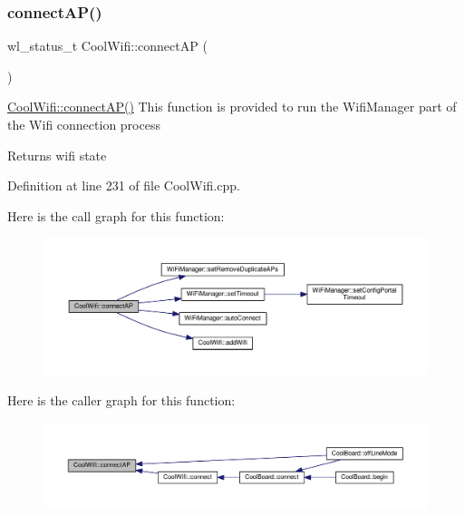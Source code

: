 \subsubsection{\texorpdfstring{connect\+A\+P()}{connectAP()}}
{\footnotesize\ttfamily wl\+\_\+status\+\_\+t Cool\+Wifi\+::connect\+AP (\begin{DoxyParamCaption}{ }\end{DoxyParamCaption})}

\hyperlink{class_cool_wifi_a7c857f27161782f5ef1d62d552aff971}{Cool\+Wifi\+::connect\+A\+P()} This function is provided to run the Wifi\+Manager part of the Wifi connection process

\begin{DoxyReturn}{Returns}
wifi state 
\end{DoxyReturn}


Definition at line 231 of file Cool\+Wifi.\+cpp.

Here is the call graph for this function\+:
\nopagebreak
\begin{figure}[H]
\begin{center}
\leavevmode
\includegraphics[width=350pt]{class_cool_wifi_a7c857f27161782f5ef1d62d552aff971_cgraph}
\end{center}
\end{figure}
Here is the caller graph for this function\+:
\nopagebreak
\begin{figure}[H]
\begin{center}
\leavevmode
\includegraphics[width=350pt]{class_cool_wifi_a7c857f27161782f5ef1d62d552aff971_icgraph}
\end{center}
\end{figure}
\mbox{\label{class_cool_wifi_a419de92d738f14b7444cf822b3ab0070}} 
